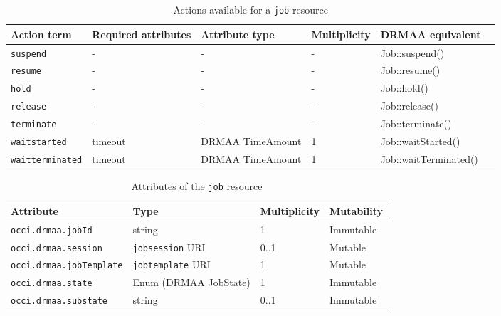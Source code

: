 \documentclass[10pt]{article}
\newcommand{\h}[1]{\lstinline|#1|}
\begin{document}
\begin{table}[ht]
\centering
\begin{tabularx}{\textwidth}{|l|l|l|l|X|l|}
\hline
Action term         & Required attributes & Attribute type    & Multiplicity & DRMAA equivalent \\
\hline
\h{suspend}         & -                   &  -                & -            & Job::suspend()  \\
\h{resume}          & -                   &  -                & -            & Job::resume()   \\
\h{hold}            & -                   &  -                & -            & Job::hold()     \\
\h{release}         & -                   &  -                & -            & Job::release()  \\
\h{terminate}       & -                   &  -                & -            & Job::terminate() \\
\h{waitstarted}     & timeout             & DRMAA TimeAmount  & 1            & Job::waitStarted() \\
\h{waitterminated}  & timeout             & DRMAA TimeAmount  & 1            & Job::waitTerminated()\\
\hline
\end{tabularx}
\caption{Actions available for a \h{job} resource}
\label{tab:jobactions}
\end{table}

\begin{table}[ht]
\centering
\begin{tabularx}{\textwidth}{|l|X|X|X|}
\hline
Attribute    & Type   & Multiplicity & Mutability \\
\hline
\h{occi.drmaa.jobId}       & string              & 1            & Immutable \\ %
\h{occi.drmaa.session}     & \h{jobsession} URI  & 0..1         & Mutable   \\ %
\h{occi.drmaa.jobTemplate} & \h{jobtemplate} URI & 1            & Mutable   \\ %
\h{occi.drmaa.state}       & Enum (DRMAA JobState)     & 1            & Immutable \\ %
\h{occi.drmaa.substate}    & string              & 0..1         & Immutable \\ %
\hline
\end{tabularx}
\caption{Attributes of the \h{job} resource}
\label{tab:jobattributes}
\end{table}
\end{document}
